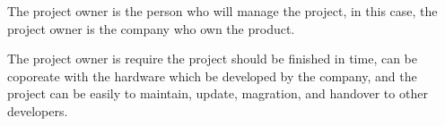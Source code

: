 The project owner is the person who will manage the project, in this case, 
the project owner is the company who own the product. 

The project owner is require the project should be finished in time, can be coporeate 
with the hardware which be developed by the company,
and the project can be easily to maintain, update, magration, and handover to other developers.
